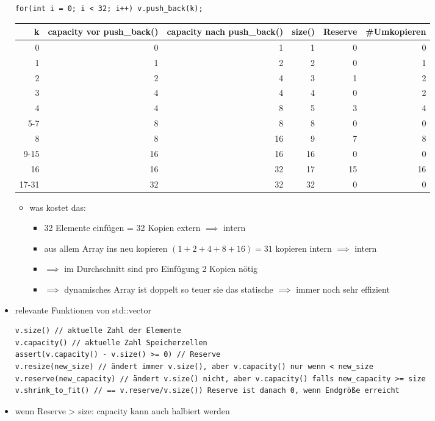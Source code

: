 \documentclass[a4paper]{scrartcl}
\theoremstyle{definition}
\theoremstyle{plain}
\theoremstyle{remark}
\theoremstyle{remark}
\begin{document}
\begin{itemize}
\begin{verbatim}
for(int i = 0; i < 32; i++) v.push_back(k);
\end{verbatim}
\begin{center}
\begin{tabular}{rrrrrr}
k & capacity vor push\_back() & capacity nach push\_back() & size() & Reserve & \#Umkopieren\\
\hline
0 & 0 & 1 & 1 & 0 & 0\\
1 & 1 & 2 & 2 & 0 & 1\\
\hline
2 & 2 & 4 & 3 & 1 & 2\\
3 & 4 & 4 & 4 & 0 & 2\\
\hline
4 & 4 & 8 & 5 & 3 & 4\\
5-7 & 8 & 8 & 8 & 0 & 0\\
\hline
8 & 8 & 16 & 9 & 7 & 8\\
9-15 & 16 & 16 & 16 & 0 & 0\\
\hline
16 & 16 & 32 & 17 & 15 & 16\\
17-31 & 32 & 32 & 32 & 0 & 0\\
\end{tabular}
\end{center}
\begin{itemize}
\item was kostet das:
\begin{itemize}
\item 32 Elemente einfügen = 32 Kopien extern $\implies$ intern
\item aus allem Array ins neu kopieren $(1 + 2 + 4 + 8 + 16) = 31$ kopieren intern $\implies$ intern
\item $\implies$ im Durchschnitt sind pro Einfügung 2 Kopien nötig
\item $\implies$ dynamisches Array ist doppelt so teuer sie das statische  $\implies$ immer noch sehr effizient
\end{itemize}
\end{itemize}
\item relevante Funktionen von std::vector
\begin{verbatim}
v.size() // aktuelle Zahl der Elemente
v.capacity() // aktuelle Zahl Speicherzellen
assert(v.capacity() - v.size() >= 0) // Reserve
v.resize(new_size) // ändert immer v.size(), aber v.capacity() nur wenn < new_size
v.reserve(new_capacity) // ändert v.size() nicht, aber v.capacity() falls new_capacity >= size
v.shrink_to_fit() // == v.reserve/v.size()) Reserve ist danach 0, wenn Endgröße erreicht
\end{verbatim}
\item wenn Reserve > size: capacity kann auch halbiert werden

\end{itemize}
\end{document}
